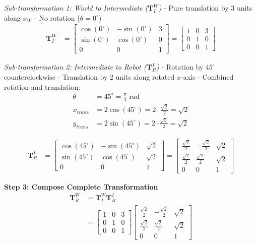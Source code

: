 \documentclass[11pt,a4paper]{article}
\begin{document}
\textit{Sub-transformation 1: World to Intermediate ($\bm{T}_I^W$)}
- Pure translation by 3 units along $x_W$
- No rotation ($\theta = 0^{\circ}$)
\begin{align}
\bm{T}_I^W &= \begin{bmatrix}
\cos(0^{\circ}) & -\sin(0^{\circ}) & 3 \\
\sin(0^{\circ}) & \cos(0^{\circ}) & 0 \\
0 & 0 & 1
\end{bmatrix} = \begin{bmatrix}
1 & 0 & 3 \\
0 & 1 & 0 \\
0 & 0 & 1
\end{bmatrix}
\end{align}

\textit{Sub-transformation 2: Intermediate to Robot ($\bm{T}_R^I$)}
- Rotation by $45^{\circ}$ counterclockwise
- Translation by 2 units along rotated $x$-axis
- Combined rotation and translation:
\begin{align}
\theta &= 45^{\circ} = \frac{\pi}{4} \text{ rad} \\
x_{trans} &= 2\cos(45^{\circ}) = 2 \cdot \frac{\sqrt{2}}{2} = \sqrt{2} \\
y_{trans} &= 2\sin(45^{\circ}) = 2 \cdot \frac{\sqrt{2}}{2} = \sqrt{2}
\end{align}

\begin{align}
\bm{T}_R^I &= \begin{bmatrix}
\cos(45^{\circ}) & -\sin(45^{\circ}) & \sqrt{2} \\
\sin(45^{\circ}) & \cos(45^{\circ}) & \sqrt{2} \\
0 & 0 & 1
\end{bmatrix} = \begin{bmatrix}
\frac{\sqrt{2}}{2} & -\frac{\sqrt{2}}{2} & \sqrt{2} \\
\frac{\sqrt{2}}{2} & \frac{\sqrt{2}}{2} & \sqrt{2} \\
0 & 0 & 1
\end{bmatrix}
\end{align}

\textbf{Step 3: Compose Complete Transformation}
\begin{align}
\bm{T}_R^W &= \bm{T}_I^W \bm{T}_R^I \\
&= \begin{bmatrix}
1 & 0 & 3 \\
0 & 1 & 0 \\
0 & 0 & 1
\end{bmatrix} \begin{bmatrix}
\frac{\sqrt{2}}{2} & -\frac{\sqrt{2}}{2} & \sqrt{2} \\
\frac{\sqrt{2}}{2} & \frac{\sqrt{2}}{2} & \sqrt{2} \\
0 & 0 & 1
\end{bmatrix}
\end{align}
\end{document}
